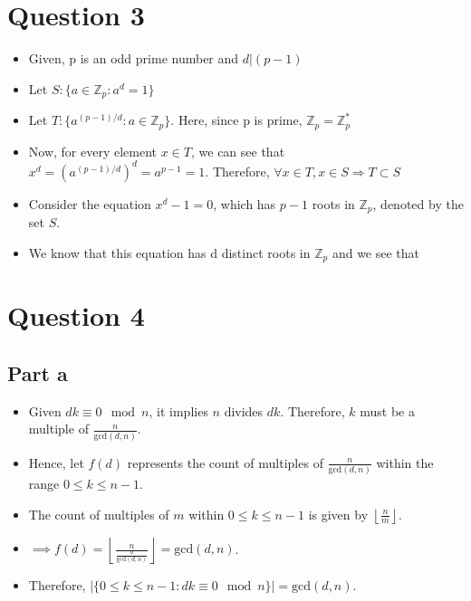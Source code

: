 \documentclass{article}
\theoremstyle{mytheoremstyle}
\theoremstyle{mytheoremstyle}
\theoremstyle{myproblemstyle}
\begin{document}
\section{Question 3}
\begin{itemize}
    \item Given, p is an odd prime number and $d | (p-1)$
    \item Let $S : \{a \in \mathbb{Z}_p : a^d = 1\}$
    \item Let $T : \{a^{(p-1)/d} : a \in \mathbb{Z}_p\}$. Here, since p is prime, $\mathbb{Z}_p = \mathbb{Z}^{*}_p$
    \item Now, for every element $x \in T$, we can see that $x^d = {(a^{(p-1)/d})}^d = a^{p-1} = 1$. Therefore, $\forall x \in T, x \in S \Rightarrow T \subset S$
    \item Consider the equation $x^{d} - 1 = 0$, which has $p-1$ roots in $\mathbb{Z}_p$, denoted by the set $S$.
    \item We know that this equation has d distinct roots in $\mathbb{Z}_p$ and we see that 
\end{itemize}
\section{Question 4}
\subsection{Part a}
\begin{itemize}
    \item Given \( dk \equiv 0 \mod n \), it implies \( n \) divides \( dk \). Therefore, \( k \) must be a multiple of \( \frac{n}{\text{gcd}(d, n)} \).
    \item Hence, let \( f(d) \) represents the count of multiples of \( \frac{n}{\text{gcd}(d, n)} \) within the range \( 0 \leq k \leq n-1 \).
    \item The count of multiples of \( m \) within \( 0 \leq k \leq n-1 \) is given by \( \left\lfloor \frac{n}{m} \right\rfloor \).
    \item \( \implies f(d) = \left\lfloor \frac{n}{\frac{n}{\text{gcd}(d, n)}} \right\rfloor = \text{gcd}(d, n) \).
    \item Therefore, \( |\{ 0 \leq k \leq n-1 : dk \equiv 0 \mod n \}| = \text{gcd}(d, n) \).
\end{itemize}
\end{document}
